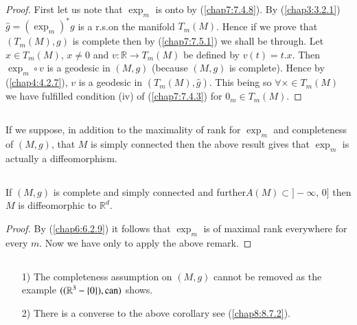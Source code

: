 \begin{proof}
First let us note that $\exp_{m}$ is onto by (\ref{chap7:7.4.8}). By
(\ref{chap3:3.2.1}) $\widehat{g}=(\exp_{m})^{\ast}g$ is a r.s.\@ on the
manifold $T_{m}(M)$. Hence if we prove that $(T_{m}(M),g)$ is complete
then by (\ref{chap7:7.5.1}) we shall be through. Let \pageoriginale $x\in
T_{m}(M)$, $x\neq 0$ and $v:\mathbb{R}\to T_{m}(M)$ be defined by
$v(t)=t.x$. Then $\exp_{m}\circ v$ is a geodesic in $(M,g)$ (because
$(M,g)$ is complete). Hence by (\ref{chap4:4.2.7}), $v$ is a geodesic in
$(T_{m}(M),\widehat{g})$. This being so $\forall \times \in T_{m}(M)$
we have fulfilled condition (iv) of (\ref{chap7:7.4.3}) for $0_{m}\in
T_{m}(M)$. 
\end{proof}

\subsection{}\label{chap7:7.5.4}

\begin{remark*}
If we suppose, in addition to the maximality of rank for $\exp_{m}$
and completeness of $(M,g)$, that $M$ is simply connected then the
above result gives that $\exp_{m}$ is actually a diffeomorphism.
\end{remark*}

\subsection{}\label{chap7:7.5.5}

\begin{coro*}
If $(M,g)$ is complete and simply connected and further\break $A(M)\subset
  ]-\infty$, $0]$ then $M$ is diffeomorphic to $\mathbb{R}^{d}$.
\end{coro*}

\begin{proof}
By (\ref{chap6:6.2.9}) it follows that $\exp_{m}$ is of maximal rank
everywhere for every $m$. Now we have only to apply the above remark.
\end{proof}


\subsection{}\label{chap7:7.5.6}

\begin{remark*}
\begin{itemize}
\item[1)] The completeness assumption on $(M,g)$ cannot be removed as
  the example $((\mathbb{R}^{3}-\{0\}),\operatorname{can})$ shows.

\item[2)] There is a converse to the above corollary see (\ref{chap8:8.7.2}).
\end{itemize}
\end{remark*}

